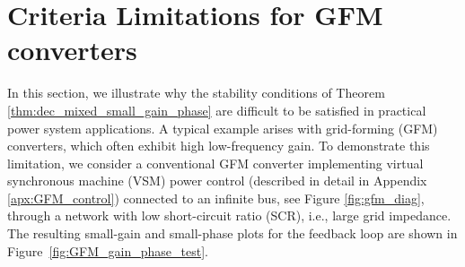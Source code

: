 \section{Criteria Limitations for GFM converters}
\label{sec:lim}

In this section, we illustrate why the stability conditions of Theorem \ref{thm:dec_mixed_small_gain_phase} are difficult to be satisfied in practical power system applications.
A typical example arises with grid-forming (GFM) converters, which often exhibit high low-frequency gain.
To demonstrate this limitation, we consider a conventional GFM converter implementing virtual synchronous machine (VSM) power control (described in detail in Appendix \ref{apx:GFM_control}) connected to an infinite bus, see Figure \ref{fig:gfm_diag}, through a network with low short-circuit ratio (SCR), i.e., large grid impedance. The resulting small-gain and small-phase plots for the feedback loop are shown in Figure~\ref{fig:GFM_gain_phase_test}.

